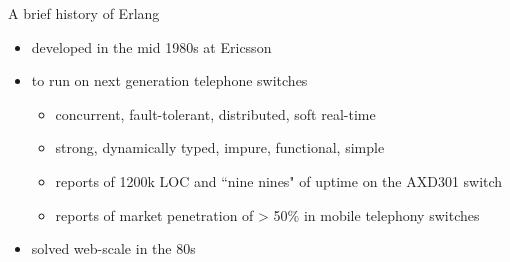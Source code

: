 \documentclass[
  ignorenonframetext,
  aspectratio=169]{beamer}
\providecommand{\tightlist}{%
  \setlength{\itemsep}{0pt}\setlength{\parskip}{0pt}}
\begin{document}
\begin{frame}{A brief history of Erlang}
\label{a-brief-history-of-erlang-3}
\begin{itemize}
\tightlist
\item
  developed in the mid 1980s at Ericsson
\item
  to run on next generation telephone switches

  \begin{itemize}
  \tightlist
  \item
    concurrent, fault-tolerant, distributed, soft real-time
  \item
    strong, dynamically typed, impure, functional, simple
  \item
    reports of 1200k LOC and ``nine nines" of uptime on the AXD301
    switch
  \item
    reports of market penetration of \textgreater{} 50\% in mobile
    telephony switches
  \end{itemize}
\item
  solved web-scale in the \textquotesingle80s
\end{itemize}


\end{frame}
\end{document}
